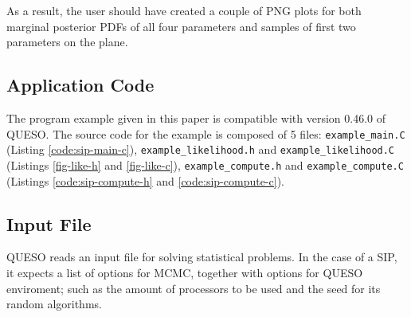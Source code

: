 As a result, the user should have created a couple of PNG plots for both
marginal posterior PDFs of all four parameters and samples of first two
parameters on the plane.


\subsection{Application Code}\label{sec:sip-code}

The program example given in this paper is compatible with version 0.46.0 of QUESO.
The source code for the example is composed of 5 files:
\texttt{example\_main.C} (Listing \ref{code:sip-main-c}),
\texttt{example\_likelihood.h} and \texttt{example\_likelihood.C} (Listings \ref{fig-like-h} and \ref{fig-like-c}),
\texttt{example\_compute.h} and \texttt{example\_compute.C} (Listings \ref{code:sip-compute-h} and \ref{code:sip-compute-c}).











 


\subsection{Input File}\label{sec:sip-input-file}


QUESO reads an input file for solving statistical problems. In the case of a SIP, it expects a list of options for MCMC,
together with options for QUESO enviroment; such as the amount of processors to be used and the seed for its random algorithms.

